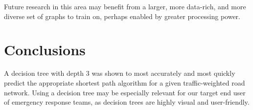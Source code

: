 \documentclass{article}
\begin{document}
Future research in this area may benefit from a larger, more data-rich, and more diverse set of graphs to train on, perhaps enabled by greater processing power.

\section{Conclusions}

A decision tree with depth 3 was shown to most accurately and most quickly predict the appropriate shortest path algorithm for a given traffic-weighted road network. Using a decision tree may be especially relevant for our target end user of emergency response teams, as decision trees are highly visual and user-friendly.



\end{document}

